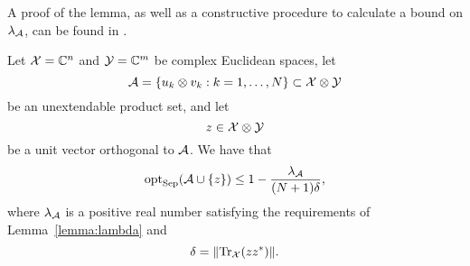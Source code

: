\noindent
A proof of the lemma, as well as a constructive procedure
to calculate a bound on $\lambda_{\mathcal{A}}$, can be found in \cite{Terhal01}.

\begin{theorem}
  \label{thm:upb}
  Let $\mathcal{X} = \mathbb{C}^n$ and $\mathcal{Y}=\mathbb{C}^m$ be complex Euclidean spaces, let
  \begin{equation}
    \mathcal{A} = \{ u_{k}\otimes v_{k} : k = 1, \ldots, N \} \subset \mathcal{X}\otimes\mathcal{Y}
  \end{equation}
  be an unextendable product set, and let 
  \begin{equation}
    z \in \mathcal{X}\otimes\mathcal{Y}
  \end{equation}
  be a unit vector orthogonal to $\mathcal{A}$.
  We have that
  \begin{equation}
    \operatorname{opt}_{\mathrm{Sep}}(\mathcal{A} \cup \{ z \}) \leq  1 - \frac{\lambda_{\mathcal{A}}}{(N + 1)\delta},
  \end{equation}
  where $\lambda_{\mathcal{A}}$ is a positive real number satisfying the requirements 
  of Lemma~\ref{lemma:lambda} and 
  \[
    \delta = \lVert\operatorname{Tr}_{\mathcal{X}}(z z^{\ast})\rVert.
  \]
\end{theorem}

